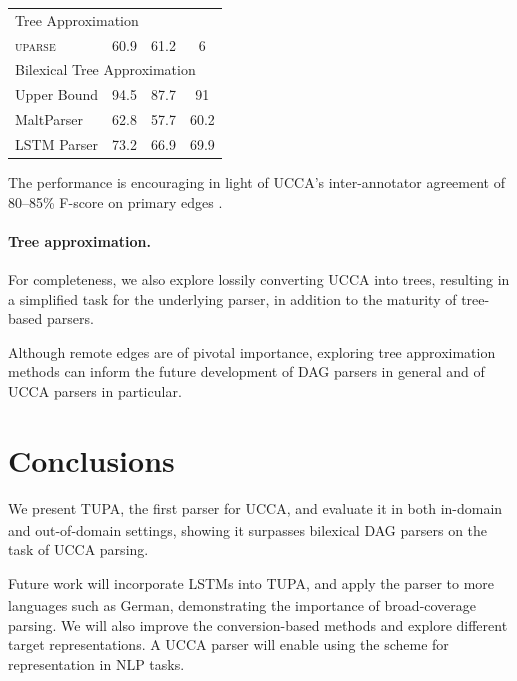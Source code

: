 \documentclass[a0,portrait]{a0poster}
\newcommand{\parser}[1]{TUPA\textsubscript{#1}}
\begin{document}
\begin{multicols}{2}
\begin{table}
\hspace{22mm}
\begin{tabular}{l|ccc}
\hline
\multicolumn{4}{l}{\rule{0pt}{2ex} \footnotesize Tree Approximation} \\
\textsc{uparse} \cite{maier-lichte:2016:DiscoNLP} & 60.9 & 61.2 & 6 \\
\hline
\multicolumn{4}{l}{\rule{0pt}{2ex} \footnotesize Bilexical Tree Approximation} \\
\small Upper Bound & \small 94.5 & \small 87.7 & \small 91 \\
MaltParser \cite{nivre2007maltparser} & 62.8 & 57.7 & 60.2 \\
LSTM Parser \cite{dyer2015transition} & 73.2 & 66.9 & 69.9
\end{tabular}
\end{table}

The performance is encouraging in light of
UCCA's inter-annotator agreement of 80--85\%
F-score on primary edges \cite{abend2013universal}.



\paragraph{Tree approximation.}

For completeness, we also explore lossily converting UCCA into trees,
resulting in a simplified task for the underlying parser,
in addition to the maturity of tree-based parsers.

Although remote edges are of pivotal importance, exploring tree approximation methods
can inform the future development of DAG parsers in general and of UCCA parsers in particular.


\section*{Conclusions}

We present \parser{}, the first parser for UCCA, and
evaluate it in both in-domain and out-of-domain settings,
showing it surpasses bilexical DAG parsers on the task of UCCA parsing.

Future work will incorporate LSTMs into \parser{},
and apply the parser to more languages such as German,
demonstrating the importance of broad-coverage parsing.
We will also improve the conversion-based methods and explore different target representations.
A UCCA parser will enable using the scheme for representation in NLP tasks.


\color{DarkSlateGray} %
\tiny


\end{multicols}
\end{document}
